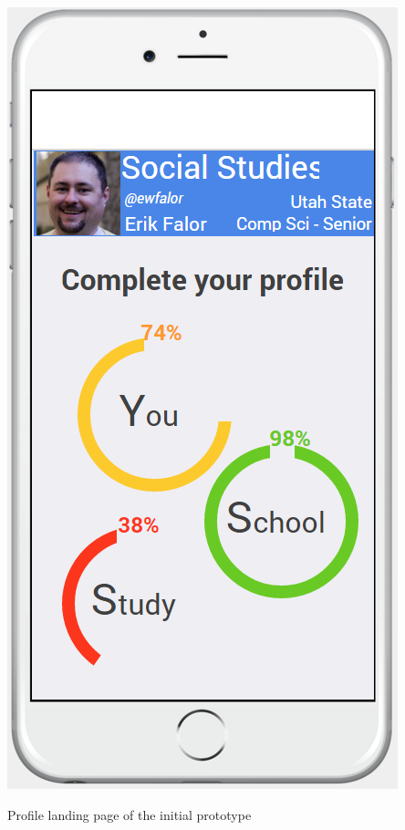 \documentclass{sigchi-ext}
\begin{document}
\begin{marginfigure}[-55pc]
	\begin{minipage}{\marginparwidth}
		\centering
		\includegraphics[width=0.9\columnwidth]{figures/prototype1.png}
		\caption{Profile landing page of the initial prototype}~\label{fig:prototype}
	\end{minipage}
\end{marginfigure}
\end{document}
